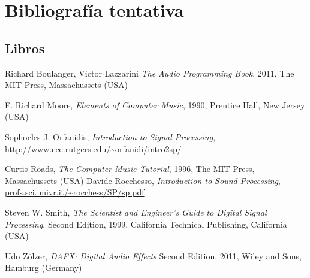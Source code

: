 \documentclass[a4paper,spanish,12pt]{article}
\begin{document}


    
    \maketitle
    

\newpage

\newpage

\newpage



\newpage\section{Bibliografía tentativa}
\subsection{Libros}
\begin{thebibliography}{9}
  Richard Boulanger, Victor Lazzarini
  \emph{The Audio Programming Book},
  2011, The MIT Press, Massachussets (USA)
 
  F. Richard Moore,
  \emph{Elements of Computer Music},
  1990, Prentice Hall, New Jersey (USA)

  Sophocles J. Orfanidis,
  \emph{Introduction to Signal Processing}, \\
  \url{http://www.ece.rutgers.edu/~orfanidi/intro2sp/}
  
  Curtis Roads,
  \emph{The Computer Music Tutorial},
  1996, The MIT Press, Massachussets (USA)
  Davide Rocchesso,
  \emph{Introduction to Sound Processing},
  \url{profs.sci.univr.it/~rocchess/SP/sp.pdf}
  
  Steven W. Smith,
  \emph{The Scientist and Engineer's Guide to Digital Signal Processing},
  Second Edition, 1999, California Technical Publishing, California (USA)
  
  Udo Zölzer,
  \emph{DAFX: Digital Audio Effects}
  Second Edition, 2011, Wiley and Sons, Hamburg (Germany)
\end{thebibliography}
  
\end{document}
